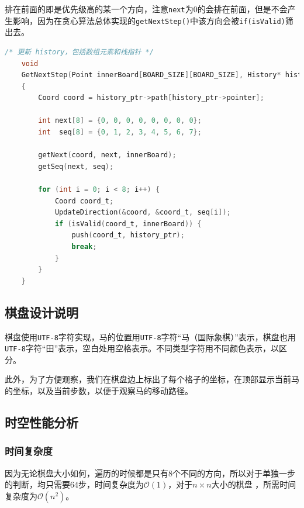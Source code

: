 \vspace{1ex}

\noindent
排在前面的即是优先级高的某一个方向，注意{\tt next}为$0$的会排在前面，但是不会产生影响，因为在贪心算法总体实现的{\tt getNextStep()}中该方向会被{\tt if(isValid)}筛出去。


\begin{lstlisting}[language=C, caption={贪心算法的总实现}]
    /* 更新 history，包括数组元素和栈指针 */
    void
    GetNextStep(Point innerBoard[BOARD_SIZE][BOARD_SIZE], History* history_ptr)
    {
        Coord coord = history_ptr->path[history_ptr->pointer];

        int next[8] = {0, 0, 0, 0, 0, 0, 0, 0};
        int  seq[8] = {0, 1, 2, 3, 4, 5, 6, 7};

        getNext(coord, next, innerBoard);
        getSeq(next, seq);

        for (int i = 0; i < 8; i++) {
            Coord coord_t;
            UpdateDirection(&coord, &coord_t, seq[i]);
            if (isValid(coord_t, innerBoard)) {
                push(coord_t, history_ptr);
                break;
            }
        }
    }
\end{lstlisting}

\subsection{棋盘设计说明}

棋盘使用{\tt UTF-8}字符实现，马的位置用{\tt UTF-8}字符“马（国际象棋）”表示，棋盘也用{\tt UTF-8}字符“田”表示，空白处用空格表示。不同类型字符用不同颜色表示，以区分。

此外，为了方便观察，我们在棋盘边上标出了每个格子的坐标，在顶部显示当前马的坐标，以及当前步数，以便于观察马的移动路径。

\subsection{时空性能分析}

\subsubsection{时间复杂度}

因为无论棋盘大小如何，遍历的时候都是只有$8$个不同的方向，所以对于单独一步的判断，均只需要$64$步，时间复杂度为$\mathcal{O}(1) $，对于$n \times n$大小的棋盘 ，所需时间复杂度为$\mathcal{O}(n^2)$。


